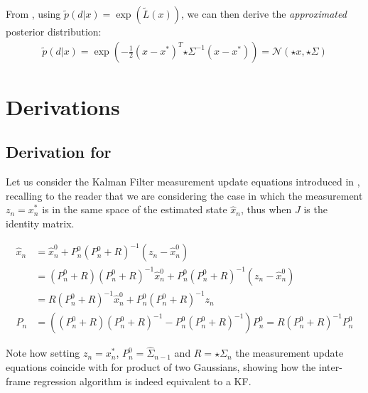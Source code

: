 % 
From , using $\tilde p(d|x) = \exp (\tilde{L}(x))$, we can then derive the \emph{approximated} posterior distribution:
%
\begin{align}
\tilde{p}(d|x) = \exp\left(- \tfrac{1}{2}(x - x^*)^T {\star{\Sigma}}^{-1}  (x - x^*) \right) = \mathcal{N}\left(\star{x}, \star{\Sigma} \right)
\end{align}
%


\section{Derivations}
\subsection{Derivation for }
\label{app:proof-kalman}
Let us consider the Kalman Filter measurement update equations introduced in , recalling to the reader that we are considering the case in which the measurement $z_n = x_n^*$ is in the same space of the estimated state $\hat{x}_n$, thus when $J$ is the identity matrix.
% 
\begin{small}
\begin{align*}
\hat{x}_n 
&= \hat{x}_n^0 + P_n^0  (P_n^0 + R)^{-1}(z_n - \hat{x}_n^0) \\
&= (P_n^0 + R)(P_n^0 + R)^{-1}\hat{x}_n^0 + P_n^0  (P_n^0 + R)^{-1}(z_n - \hat{x}_n^0) \\
&= R(P_n^0 + R)^{-1}\hat{x}_n^0 + P_n^0  (P_n^0 + R)^{-1}z_n \\
% 
% 
P_n &= ((P_n^0 + R) (P_n^0 + R)^{-1} - P_n^0  (P_n^0 + R)^{-1}) P_n^0 = R (P_n^0 + R)^{-1} P_n^0
\end{align*}
\end{small}
% 
Note how setting $z_n = x_n^*$, $P_n^0 = \hat{\Sigma}_{n - 1}$ and $R = \star\Sigma_{n}$ the measurement update equations coincide with  for product of two Gaussians, showing how the inter-frame regression algorithm is indeed equivalent to a KF.

